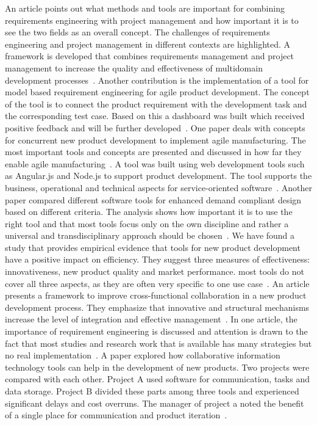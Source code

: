     An article points out what methods and tools are important for combining requirements engineering with project management and how important it is to see the two fields as an overall concept. The challenges of requirements engineering and project management in different contexts are highlighted. A framework is developed that combines requirements management and project management to increase the quality and effectiveness of multidomain development processes~\cite{Jorma2014}.
    Another contribution is the implementation of a tool for model based requirement engineering for agile product development. The concept of the tool is to connect the product requirement with the development task and the corresponding test case. Based on this a dashboard was built which received positive feedback and will be further developed~\cite{WINDISCH2022550}.
    One paper deals with concepts for concurrent new product development to implement agile manufacturing. The most important tools and concepts are presented and discussed in how far they enable agile manufacturing~\cite{buyukozkan2004survey}.
    A tool was built using web development tools such as Angular.js and Node.js to support product development. The tool supports the business, operational and technical aspects for service-oriented software~\cite{belfadel2022requirements}.
    Another paper compared different software tools for enhanced demand compliant design based on different criteria. The analysis shows how important it is to use the right tool and that most tools focus only on the own discipline and rather a universal and transdisciplinary approach should be chosen~\cite{9447081}.
    We have found a study that provides empirical evidence that tools for new product development have a positive impact on efficiency. They suggest three measures of effectiveness: innovativeness, new product quality and market performance. most tools do not cover all three aspects, as they are often very specific to one use case~\cite{DURMUSOGLU2011321}.
    An article presents a framework to improve cross-functional collaboration in a new product development process. They emphasize that innovative and structural mechanisms increase the level of integration and effective management~\cite{Jassawalla}.
    In one article, the importance of requirement engineering is discussed and attention is drawn to the fact that most studies and research work that is available has many strategies but no real implementation~\cite{kumar2022requirements}.
    A paper explored how collaborative information technology tools can help in the development of new products. Two projects were compared with each other. Project A used software for communication, tasks and data storage. Project B divided these parts among three tools and experienced significant delays and cost overruns. The manager of project a noted the benefit of a single place for communication and product iteration~\cite{marion_fixson_2019}.

